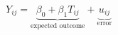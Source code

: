 \documentclass[border=1pt]{standalone}
\begin{document}
$\displaystyle Y_{ij}=\underbrace{\beta_0+\beta_1T_{ij}}_{\text{expected outcome}}+\underbrace{u_{ij}}_{\text{error}}$
\end{document}
